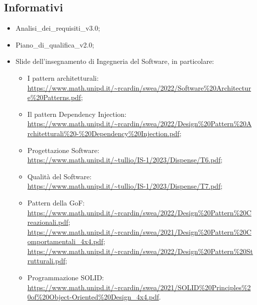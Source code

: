 \subsection{Informativi}
\begin{itemize}
    \item Analisi\_dei\_requisiti\_v3.0;
    \item Piano\_di\_qualifica\_v2.0;
    \item Slide dell’insegnamento di Ingegneria del Software, in particolare:
        \begin{itemize}
            \item I pattern architetturali: \\ \url{https://www.math.unipd.it/~rcardin/swea/2022/Software%20Architecture%20Patterns.pdf};
            \item Il pattern Dependency Injection:\\ \url{https://www.math.unipd.it/~rcardin/swea/2022/Design%20Pattern%20Architetturali%20-%20Dependency%20Injection.pdf};
            \item Progettazione Software:\\ \url{https://www.math.unipd.it/~tullio/IS-1/2023/Dispense/T6.pdf};
            \item Qualità del Software:\\ \url{https://www.math.unipd.it/~tullio/IS-1/2023/Dispense/T7.pdf};
            \item Pattern della GoF:\\ \url{https://www.math.unipd.it/~rcardin/swea/2022/Design%20Pattern%20Creazionali.pdf};\\
            \url{https://www.math.unipd.it/~rcardin/swea/2021/Design%20Pattern%20Comportamentali_4x4.pdf};\\
            \url{https://www.math.unipd.it/~rcardin/swea/2022/Design%20Pattern%20Strutturali.pdf};
            \item Programmazione SOLID:\\ \url{https://www.math.unipd.it/~rcardin/swea/2021/SOLID%20Principles%20of%20Object-Oriented%20Design_4x4.pdf}.
        \end{itemize}
\end{itemize}
